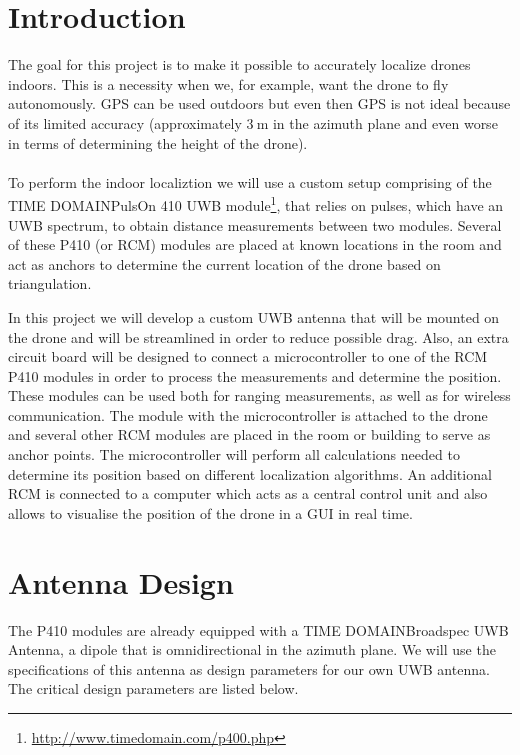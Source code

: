 \documentclass[a4paper]{article}        %
\begin{document}

\newpage
  \tableofcontents
\newpage

\section{Introduction}

The goal for this project is to make it possible to accurately localize drones indoors. This is a necessity when we, for example, want the drone to fly autonomously. GPS can be used outdoors but even then GPS is not ideal because of its limited accuracy (approximately $\SI{3}{\meter}$ in the azimuth plane and even worse in terms of determining the height of the drone). \\\\
To perform the indoor localiztion we will use a custom setup comprising of the TIME DOMAIN\texttrademark PulsOn 410 UWB module\footnote{\url{http://www.timedomain.com/p400.php}}, that relies on pulses, which have an UWB spectrum, to  obtain distance measurements between two modules. Several of these P410 (or RCM) modules are placed at known locations in the room and act as anchors to determine the current location of the drone based on triangulation.

 In this project we will develop a custom UWB antenna that will be mounted on the drone and will be streamlined in order to reduce possible drag. Also, an extra circuit board will be designed to connect a microcontroller to one of the RCM P410 modules in order to process the measurements and determine the position. These modules can be used both for ranging measurements, as well as for wireless communication. The module with the microcontroller is attached to the drone and several other RCM modules are placed in the room or building to serve as anchor points. The microcontroller will perform all calculations needed to determine its position based on different localization algorithms. An additional RCM is connected to a computer which acts as a central control unit and also allows to visualise the position of the drone in a GUI in real time. 

\section{Antenna Design}
	
	 The P410 modules are already equipped with a TIME DOMAIN\texttrademark Broadspec UWB Antenna, a dipole that is omnidirectional in the azimuth plane. We will use the specifications of this antenna as design parameters for our own UWB antenna. The critical design parameters are listed below. 
\end{document}
